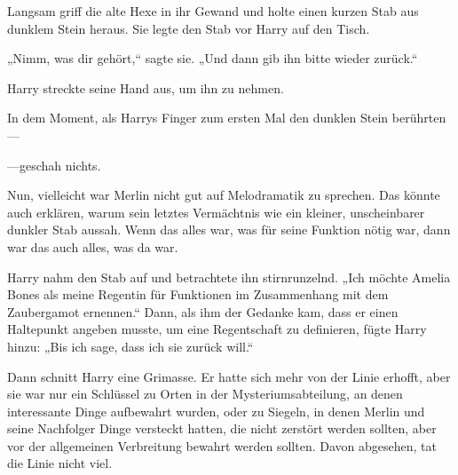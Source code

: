 Langsam griff die alte Hexe in ihr Gewand und holte einen kurzen Stab aus dunklem Stein heraus. Sie legte den Stab vor Harry auf den Tisch.

„Nimm, was dir gehört,“ sagte sie. „Und dann gib ihn bitte wieder zurück.“

Harry streckte seine Hand aus, um ihn zu nehmen.

In dem Moment, als Harrys Finger zum ersten Mal den dunklen Stein berührten—

—geschah nichts.

Nun, vielleicht war Merlin nicht gut auf Melodramatik zu sprechen. Das könnte auch erklären, warum sein letztes Vermächtnis wie ein kleiner, unscheinbarer dunkler Stab aussah. Wenn das alles war, was für seine Funktion nötig war, dann war das auch alles, was da war.

Harry nahm den Stab auf und betrachtete ihn stirnrunzelnd.
„Ich möchte Amelia Bones als meine Regentin für Funktionen im Zusammenhang mit dem Zaubergamot ernennen.“ Dann, als ihm der Gedanke kam, dass er einen Haltepunkt angeben musste, um eine Regentschaft zu definieren, fügte Harry hinzu:
„Bis ich sage, dass ich sie zurück will.“

Dann schnitt Harry eine Grimasse. Er hatte sich mehr von der Linie erhofft, aber sie war nur ein Schlüssel zu Orten in der Mysteriumsabteilung, an denen interessante Dinge aufbewahrt wurden, oder zu Siegeln, in denen Merlin und seine Nachfolger Dinge versteckt hatten, die nicht zerstört werden sollten, aber vor der allgemeinen Verbreitung bewahrt werden sollten.
Davon abgesehen, tat die Linie nicht viel.

